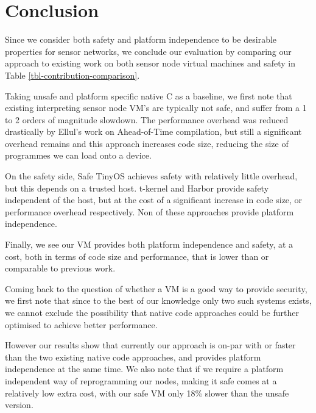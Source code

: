 \section{Conclusion}


Since we consider both safety and platform independence to be desirable properties for sensor networks, we conclude our evaluation by comparing our approach to existing work on both sensor node virtual machines and safety in Table \ref{tbl-contribution-comparison}.

Taking unsafe and platform specific native C as a baseline, we first note that existing interpreting sensor node VM's are typically not safe, and suffer from a 1 to 2 orders of magnitude slowdown. The performance overhead was reduced drastically by Ellul's work on Ahead-of-Time compilation, but still a significant overhead remains and this approach increases code size, reducing the size of programmes we can load onto a device.

On the safety side, Safe TinyOS achieves safety with relatively little overhead, but this depends on a trusted host. t-kernel and Harbor provide safety independent of the host, but at the cost of a significant increase in code size, or performance overhead respectively. Non of these approaches provide platform independence.

Finally, we see our VM provides both platform independence and safety, at a cost, both in terms of code size and performance, that is lower than or comparable to previous work.

Coming back to the question of whether a VM is a good way to provide security, we first note that since to the best of our knowledge only two such systems exists, we cannot exclude the possibility that native code approaches could be further optimised to achieve better performance.

However our results show that currently our approach is on-par with or faster than the two existing native code approaches, and provides platform independence at the same time. We also note that if we require a platform independent way of reprogramming our nodes, making it safe comes at a relatively low extra cost, with our safe VM only 18\% slower than the unsafe version.